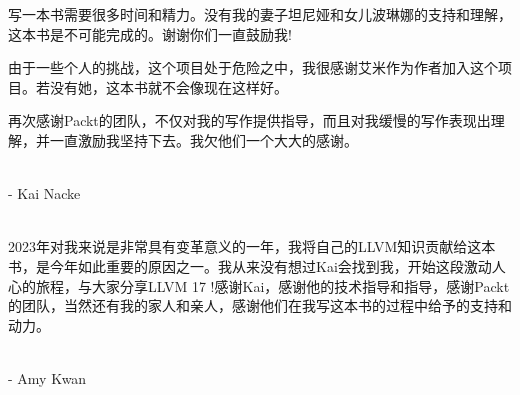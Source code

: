 \begin{center}

写一本书需要很多时间和精力。没有我的妻子坦尼娅和女儿波琳娜的支持和理解，这本书是不可能完成的。谢谢你们一直鼓励我!

由于一些个人的挑战，这个项目处于危险之中，我很感谢艾米作为作者加入这个项目。若没有她，这本书就不会像现在这样好。

再次感谢Packt的团队，不仅对我的写作提供指导，而且对我缓慢的写作表现出理解，并一直激励我坚持下去。我欠他们一个大大的感谢。

\hspace*{\fill} \\

- Kai Nacke

\hspace*{\fill} \\

2023年对我来说是非常具有变革意义的一年，我将自己的LLVM知识贡献给这本书，是今年如此重要的原因之一。我从来没有想过Kai会找到我，开始这段激动人心的旅程，与大家分享LLVM 17 !感谢Kai，感谢他的技术指导和指导，感谢Packt的团队，当然还有我的家人和亲人，感谢他们在我写这本书的过程中给予的支持和动力。

\hspace*{\fill} \\

- Amy Kwan

\end{center}